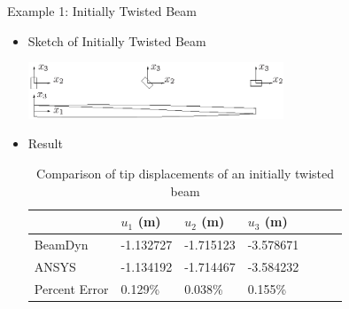 \documentclass[dvips,xcolor=cmyk]{beamer}
\begin{document}
\begin{frame}{Example 1: Initially Twisted Beam}
    \begin{itemize}
    \item Sketch of Initially Twisted Beam
    \begin{center}
    \includegraphics[width=3.0in]{EPSF/twist_beam.eps}
    \end{center}
    \item Result
    \begin{table}
    \caption{\label{E1u} Comparison of tip displacements of an initially twisted beam} 
    \begin{center} 
        \begin{tabular}{| l | l | l | l | l | l | l |}
    	    \hline
    	        & $u_1$ (m) & $u_2$ (m) & $u_3$ (m)  \\ \hline
    	BeamDyn  & -1.132727     & -1.715123       & -3.578671      \\  \hline
    	ANSYS   & -1.134192     & -1.714467      & -3.584232     \\ \hline
    	Percent Error   & 0.129\%     & 0.038\%      & 0.155\%     \\ \hline
    \end{tabular}
\end{center}
\end{table} 
    \end{itemize}
\end{frame}
\end{document}
